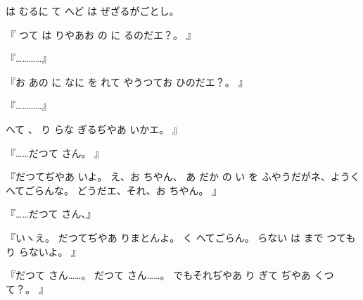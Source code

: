 は
むるに
て
へど
は
ぜざるがごとし。

『
つて
は
りやあお
の
に
るのだエ？。
』

『…………』

『お
あの
に
なに
を
れて
やうつてお
ひのだエ？。
』

『…………』

へて
、
り
らな
ぎるぢやあ
いかエ。
』

『……だつて
さん。
』

『だつてぢやあ
いよ。
え、お
ちやん、
あ
だか
の
い
を
ふやうだがネ、ようく
へてごらんな。
どうだエ、それ、お
ちやん。
』

『……だつて
さん、』

『いヽえ。
だつてぢやあ
りまとんよ。
く
へてごらん。
らない
は
まで
つても
り
らないよ。
』

『だつて
さん……。
だつて
さん……。
でもそれぢやあ
り
ぎて
ぢやあ
くつて？。
』

